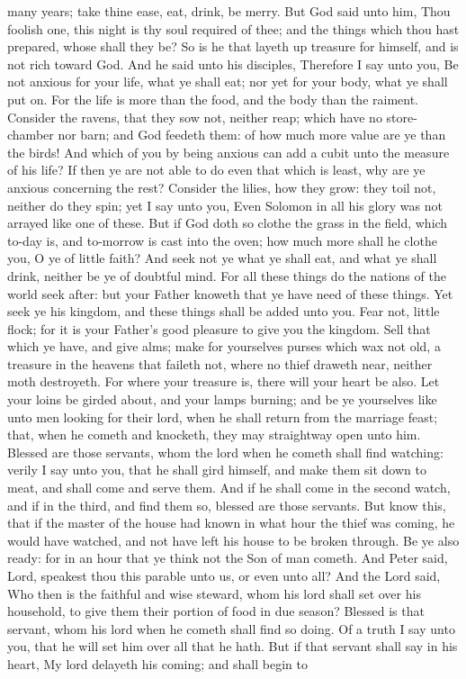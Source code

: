 many years; take thine ease, eat, drink, be merry. But God said unto him, Thou foolish one, this night is thy soul required of thee; and the things which thou hast prepared, whose shall they be? So is he that layeth up treasure for himself, and is not rich toward God.  And he said unto his disciples, Therefore I say unto you, Be not anxious for your life, what ye shall eat; nor yet for your body, what ye shall put on. For the life is more than the food, and the body than the raiment. Consider the ravens, that they sow not, neither reap; which have no store-chamber nor barn; and God feedeth them: of how much more value are ye than the birds! And which of you by being anxious can add a cubit unto the measure of his life? If then ye are not able to do even that which is least, why are ye anxious concerning the rest? Consider the lilies, how they grow: they toil not, neither do they spin; yet I say unto you, Even Solomon in all his glory was not arrayed like one of these. But if God doth so clothe the grass in the field, which to-day is, and to-morrow is cast into the oven; how much more shall he clothe you, O ye of little faith? And seek not ye what ye shall eat, and what ye shall drink, neither be ye of doubtful mind. For all these things do the nations of the world seek after: but your Father knoweth that ye have need of these things. Yet seek ye his kingdom, and these things shall be added unto you. Fear not, little flock; for it is your Father’s good pleasure to give you the kingdom. Sell that which ye have, and give alms; make for yourselves purses which wax not old, a treasure in the heavens that faileth not, where no thief draweth near, neither moth destroyeth. For where your treasure is, there will your heart be also.  Let your loins be girded about, and your lamps burning; and be ye yourselves like unto men looking for their lord, when he shall return from the marriage feast; that, when he cometh and knocketh, they may straightway open unto him. Blessed are those servants, whom the lord when he cometh shall find watching: verily I say unto you, that he shall gird himself, and make them sit down to meat, and shall come and serve them. And if he shall come in the second watch, and if in the third, and find them so, blessed are those servants. But know this, that if the master of the house had known in what hour the thief was coming, he would have watched, and not have left his house to be broken through. Be ye also ready: for in an hour that ye think not the Son of man cometh.  And Peter said, Lord, speakest thou this parable unto us, or even unto all? And the Lord said, Who then is the faithful and wise steward, whom his lord shall set over his household, to give them their portion of food in due season? Blessed is that servant, whom his lord when he cometh shall find so doing. Of a truth I say unto you, that he will set him over all that he hath. But if that servant shall say in his heart, My lord delayeth his coming; and shall begin to 